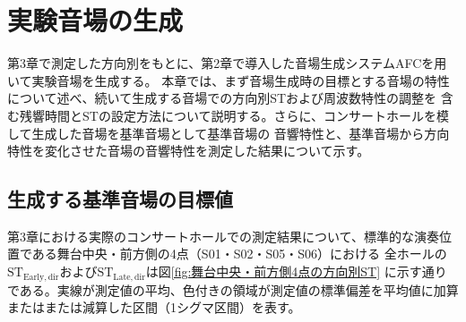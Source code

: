 \documentclass[11pt,a4j]{jreport}
\begin{document}
\chapter{実験音場の生成}

第3章で測定した方向別をもとに、第2章で導入した音場生成システムAFCを用いて実験音場を生成する。
本章では、まず音場生成時の目標とする音場の特性について述べ、続いて生成する音場での方向別STおよび周波数特性の調整を
含む残響時間とSTの設定方法について説明する。さらに、コンサートホールを模して生成した音場を基準音場として基準音場の
音響特性と、基準音場から方向特性を変化させた音場の音響特性を測定した結果について示す。


  \section{生成する基準音場の目標値}
    第3章における実際のコンサートホールでの測定結果について、標準的な演奏位置である舞台中央・前方側の4点（S01・S02・S05・S06）における
    全ホールの$\mathrm{ST_{Early,dir}}$および$\mathrm{ST_{Late,dir}}$は図\ref{fig:舞台中央・前方側4点の方向別ST}
    に示す通りである。実線が測定値の平均、色付きの領域が測定値の標準偏差を平均値に加算またはまたは減算した区間（1シグマ区間）を表す。
\end{document}
